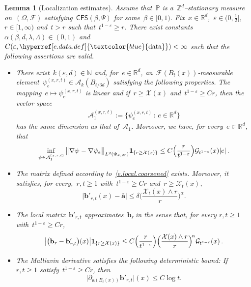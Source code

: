 \documentclass[11pt,twoside]{article} %
\numberwithin{equation}{section}
\newtheorem{lemma}[theorem]{Lemma}
\theoremstyle{definition}
\newcommand{\dataref}{\hyperref[e.data.def]{\textcolor{blue}{\ensuremath{\mathrm{data}}}}}
\let\originalleft\left
\let\originalright\right
\renewcommand{\left}{\mathopen{}\mathclose\bgroup\originalleft}
\renewcommand{\right}{\aftergroup\egroup\originalright}
\newcommand*{\N}{\ensuremath{\mathbb{N}}}
\newcommand*{\R}{\ensuremath{\mathbb{R}}}
\newcommand*{\Zd}{\ensuremath{\mathbb{Z}^d}}
\newcommand{\eps}{\varepsilon}
\renewcommand{\b}{\ensuremath{\mathbf{b}}}
\newcommand{\ep}{\eps}
\renewcommand{\a}{\mathbf{a}}
\newcommand{\ahom}{\bar{\a}}
\newcommand{\F}{\mathcal{F}}
\renewcommand{\P}{\mathbb{P}}
\newcommand{\X}{\mathcal{X}}
\newcommand{\indc}{\boldsymbol{1}}
\newcommand{\CFS}{\mathsf{CFS}}
\newcommand{\A}{\mathcal{A}}
\begin{document}
\begin{lemma}[Localization estimates]
\label{l.correctorloc}
Assume that~$\P$ is a~$\Zd$--stationary measure on~$(\Omega,\F)$ satisfying~$\CFS(\beta,\Psi)$ for some~$\beta \in [0,1)$. 
Fix~$x\in \R^d$,~$\ep \in (0,\frac12]$,~$r \in [1,\infty)$ and~$t>r$ such that~$t^{1-\ep} \geq r$. There exist constants~$\alpha(\beta,d,\lambda,\Lambda) \in (0,1)$ and~$C(\ep,\dataref)<\infty$ such that the following assertions are valid. 
\begin{itemize}


\item 
There exist~$k(\ep,d) \in \N$ and, for~$e \in \R^d$, an~$\F(B_{t}(x))$-measurable element~$\psi_e^{(x,r,t)} \in \A_k(B_{t/3d})$ satisfying the following properties.  The mapping~$e \mapsto \psi_{e}^{(x,r,t)}$ is linear and if~$r \geq \X(x)$ and~$t^{1-\ep} \geq C r$, then the vector space
\begin{align} \label{e.localA1}
\mathcal{A}_1^{(x,r,t)} := \big\{   \psi_{e}^{(x,r,t)} \, : \, e \in \R^d \big\} 
\end{align}
has the same dimension as that of~$\A_1$. Moreover, we have, for every~$e \in \R^d$, that
\begin{align}  \label{e.correctorloc.converse}
\inf_{\psi \in \mathcal{A}_1^{(x,r,t)}}
\big\|  \nabla \psi - \nabla \psi_e \big\|_{L^2(\Phi_{x,2r})}
\indc_{\{ r\geq \X(x) \}}
\leq 
C
\Bigl( \frac{r}{t^{1-\ep}} \Bigr)
\mathcal{G}_{t^{1-\ep}}(x)  |e| 
\,. 
\end{align}

\item 
The matrix defined according to~\eqref{e.local.coarsened} exists. Moreover, it satisfies, 
for every,~$r,t\geq 1$ with~$t^{1-\ep} \geq C r$ and~$r\geq \X_t(x)$,
\begin{equation}
\label{e.matrix.local}
\big| {\b}'_{r,t}(x) - \ahom \big| \leq  \delta \biggl( \frac{\X_t(x) \wedge r}{r} \biggr)^{\alpha} .
\end{equation}

\item
The local matrix~$\b'_{r,t}$ approximates~$\b_r~$in the sense that, for every 
$r,t\geq 1$ with~$t^{1-\ep} \geq Cr$,
\begin{equation} \label{e.localizationestimate}
\big| \bigl(\b_r - \b'_{r,t} \bigr)(x) \big| 
\indc_{\left\{ r \geq \X (x) \right\}}
\leq
C
\Bigl( \frac{r }{t^{1-\ep}} \Bigr)
\Bigl( \frac{\X(x) \wedge r}{r} \Bigr)^{\! \alpha} 
\mathcal{G}_{t^{1-\ep}}(x)
\,.
\end{equation}


\item 
The Malliavin derivative satisfies the following deterministic bound: If~$r,t\geq 1$ satisfy~$t^{1-\ep} \geq Cr$, then
\begin{equation}  \label{e.malliavin.local}
\bigl| \partial_{\a(B_{t}(x))}  \b'_{r,t}\bigr|  (x) \leq C \log t .
\end{equation}
\end{itemize}

\end{lemma}
\end{document}
